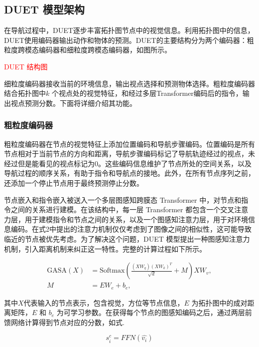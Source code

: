 \documentclass[bachelor]{thesis-uestc}
\begin{document}
\subsection{DUET 模型架构}

在导航过程中，DUET逐步丰富拓扑图节点中的视觉信息。利用拓扑图中的信息，DUET使用编码器输出动作和物体的预测。DUET的主要结构分为两个编码器：粗粒度跨模态编码器和细粒度跨模态编码器，如图所示。

\textcolor{red}{DUET 结构图}

细粒度编码器接收当前的环境信息，输出视点选择和预测物体选择。粗粒度编码器结合拓扑图中$k$ 个视点处的视觉特征，和经过多层Transformer编码后的指令，输出视点预测分数。下面将详细介绍其功能。

\subsubsection{粗粒度编码器}

粗粒度编码器在节点的视觉特征上添加位置编码和导航步骤编码。位置编码是所有节点相对于当前节点的方向和距离，导航步骤编码标记了导航轨迹经过的视点，未经过但是能看见的视点标记为0。这些编码信息维护了节点所处的空间关系，以及导航过程的顺序关系，有助于指令和导航点的接地。此外，在所有节点序列之前，还添加一个停止节点用于最终预测停止分数。

节点嵌入和指令嵌入被送入一个多层图感知跨膜态 Transformer 中，对节点和指令之间的关系进行建模。在该结构中，每一层 Transformer 都包含一个交叉注意力层，用于建模指令和节点之间的关系，以及一个图感知注意力层，用于对环境信息编码。在式2中提出的注意力机制仅仅考虑到了图像之间的相似性，这可能导致临近的节点被优先考虑。为了解决这个问题，DUET 模型提出一种图感知注意力机制，引入距离机制来纠正这一特性。完整的计算过程如下所示。

\begin{equation}
    \begin{aligned}
        \text{GASA}(X) &= \text{Softmax} \left( \frac{(XW_{q})(XW_{k})^{T}}{\sqrt{d}} + M \right) XW_{v}, \\
        M &= EW_{e} + b_{e},
    \end{aligned}
\label{GASA}
\end{equation}

其中$X$代表输入的节点表示，包含视觉，方位等节点信息，$E$ 为拓扑图中的成对距离矩阵，$E$ 和 $b_{e}$ 为可学习参数。在获得每个节点的图感知编码之后，通过两层前馈网络计算得到节点对应的分数，如式.

\begin{equation}
    s^c_i = FFN(\hat{v_i})
\label{}
\end{equation}
\end{document}
